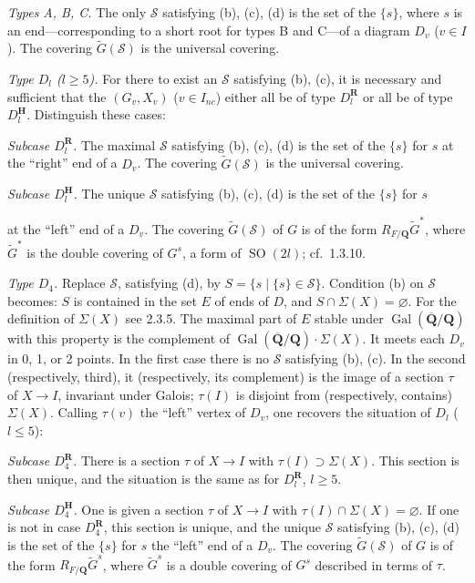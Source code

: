 \documentclass[10pt,a4paper]{article}
\newcommand{\SourcePage}[2]{\clearpage\setcounter{page}{#2}\typeout{D031_SOURCE_PAGE physical=#1 printed=#2}}
\begin{document}
\emph{Types A, B, C.} The only \(\mathscr S\) satisfying (b), (c), (d) is the set of the \(\{s\}\), where \(s\) is an end---corresponding to a short root for types B and C---of a diagram \(D_v\) (\(v\in I\)). The covering \(\widetilde G(\mathscr S)\) is the universal covering.

\emph{Type \(D_l\) (\(l\ge5\)).} For there to exist an \(\mathscr S\) satisfying (b), (c), it is necessary and sufficient that the \((G_v,X_v)\) (\(v\in I_{nc}\)) either all be of type \(D_l^{\mathbf R}\) or all be of type \(D_l^{\mathbf H}\). Distinguish these cases:

\emph{Subcase \(D_l^{\mathbf R}\).} The maximal \(\mathscr S\) satisfying (b), (c), (d) is the set of the \(\{s\}\) for \(s\) at the ``right'' end of a \(D_v\). The covering \(\widetilde G(\mathscr S)\) is the universal covering.

\emph{Subcase \(D_l^{\mathbf H}\).} The unique \(\mathscr S\) satisfying (b), (c), (d) is the set of the \(\{s\}\) for \(s\)

\SourcePage{26}{272}
at the ``left'' end of a \(D_v\). The covering \(\widetilde G(\mathscr S)\) of \(G\) is of the form \(R_{F/\mathbf Q}\widetilde G^*\), where \(\widetilde G^*\) is the double covering of \(G^s\), a form of \(\operatorname{SO}(2l)\); cf.~1.3.10.

\emph{Type \(D_4\).} Replace \(\mathscr S\), satisfying (d), by \(S=\{s\mid\{s\}\in\mathscr S\}\). Condition (b) on \(\mathscr S\) becomes: \(S\) is contained in the set \(E\) of ends of \(D\), and \(S\cap\Sigma(X)=\varnothing\). For the definition of \(\Sigma(X)\) see 2.3.5. The maximal part of \(E\) stable under \(\operatorname{Gal}(\overline{\mathbf Q}/\mathbf Q)\) with this property is the complement of \(\operatorname{Gal}(\overline{\mathbf Q}/\mathbf Q)\cdot\Sigma(X)\). It meets each \(D_v\) in 0, 1, or 2 points. In the first case there is no \(\mathscr S\) satisfying (b), (c). In the second (respectively, third), it (respectively, its complement) is the image of a section \(\tau\) of \(X\to I\), invariant under Galois; \(\tau(I)\) is disjoint from (respectively, contains) \(\Sigma(X)\). Calling \(\tau(v)\) the ``left'' vertex of \(D_v\), one recovers the situation of \(D_l\) (\(l\le5\)):

\emph{Subcase \(D_4^{\mathbf R}\).} There is a section \(\tau\) of \(X\to I\) with \(\tau(I)\supset\Sigma(X)\). This section is then unique, and the situation is the same as for \(D_l^{\mathbf R}\), \(l\ge5\).

\emph{Subcase \(D_4^{\mathbf H}\).} One is given a section \(\tau\) of \(X\to I\) with \(\tau(I)\cap\Sigma(X)=\varnothing\). If one is not in case \(D_4^{\mathbf R}\), this section is unique, and the unique \(\mathscr S\) satisfying (b), (c), (d) is the set of the \(\{s\}\) for \(s\) the ``left'' end of a \(D_v\). The covering \(\widetilde G(\mathscr S)\) of \(G\) is of the form \(R_{F/\mathbf Q}\widetilde G^s\), where \(\widetilde G^s\) is a double covering of \(G^s\) described in terms of \(\tau\).
\end{document}
